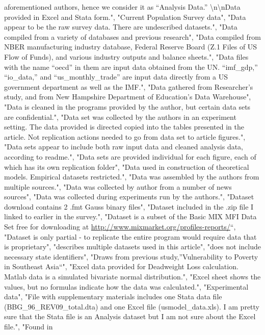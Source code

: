 \documentclass[]{article}
\begin{document}
\begin{itemize}
  aforementioned authors, hence we consider it as ``Analysis Data.''
  \textbackslash{}n\textbackslash{}nData provided in Excel and Stata
  form.", "Current Population Survey data", "Data appear to be the raw
  survey data. There are undescribed datasets.", "Data compiled from a
  variety of databases and previous research", "Data compiled from NBER
  manufacturing industry database, Federal Reserve Board (Z.1 Files of
  US Flow of Funds), and various industry outputs and balance sheets.",
  "Data files with the name ``oecd'' in them are input data obtained
  from the UN. ``imf\_gdp,'' ``io\_data,'' and ``us\_monthly\_trade''
  are input data directly from a US government department as well as the
  IMF.", "Data gathered from Researcher's study, and from New Hampshire
  Department of Education's Data Warehouse", "Data is cleaned in the
  programs provided by the author, but certain data sets are
  confidential.", "Data set was collected by the authors in an
  experiment setting. The data provided is directed copied into the
  tables presented in the article. Not replication actions needed to go
  from data set to article figures.", "Data sets appear to include both
  raw input data and cleaned analysis data, according to readme.", "Data
  sets are provided individual for each figure, each of which has its
  own replication folder", "Data used in construction of theoretical
  models. Empirical datasets restricted.", "Data was assembled by the
  authors from multiple sources.", "Data was collected by author from a
  number of news sources", "Data was collected during experiments run by
  the authors.", "Dataset download contains 2 .fmt Gauss binary files",
  "Dataset included in the .zip file I linked to earlier in the
  survey.", "Dataset is a subset of the Basic MIX MFI Data Set free for
  downloading at \url{http://www.mixmarket.org/profiles-reports/}``,
  "Dataset is only partial - to replicate the entire program would
  require data that is proprietary", "describes multiple datasets used
  in this article", "does not include necessary state identifiers",
  "Draws from previous study,''Vulnerability to Poverty in Southeast
  Asia``", "Excel data provided for Deadweight Loss calculation. Matlab
  data is a simulated bivariate normal distribution.", "Excel sheet
  shows the values, but no formulas indicate how the data was
  calculated.", "Experimental data", "File with supplementary materials
  includes one Stata data file (BBG\_96\_REV09\_total.dta) and one Excel
  file (usmodel\_data.xls). I am pretty sure that the Stata file is an
  Analysis dataset but I am not sure about the Excel file.", "Found in

\end{itemize}
\end{document}
